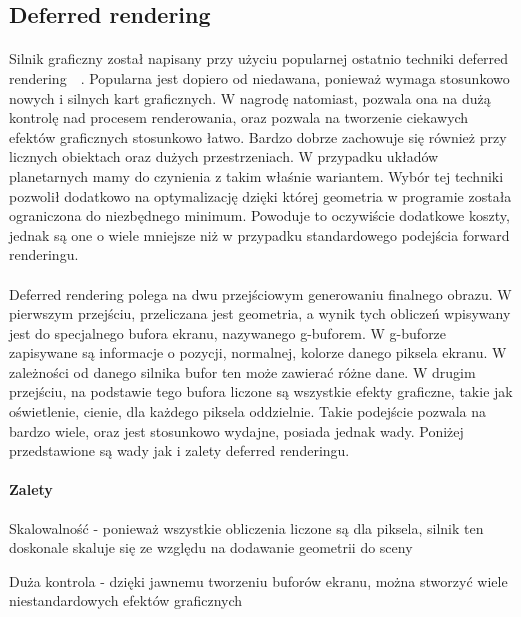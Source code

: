 \subsection{Deferred rendering}\label{sub:deferred rendering}
\paragraph{}

Silnik graficzny został napisany przy użyciu popularnej ostatnio techniki deferred rendering~\cite{gpugems:deferred}~\cite{calver:deferred}. Popularna jest dopiero od niedawana, ponieważ wymaga stosunkowo nowych i silnych kart graficznych. W nagrodę natomiast, pozwala ona na dużą kontrolę nad procesem renderowania, oraz pozwala na tworzenie ciekawych efektów graficznych stosunkowo łatwo. Bardzo dobrze zachowuje się również przy licznych obiektach oraz dużych przestrzeniach. W przypadku układów planetarnych mamy do czynienia z takim właśnie wariantem. Wybór tej techniki pozwolił dodatkowo na optymalizację dzięki której geometria w programie została ograniczona do niezbędnego minimum. Powoduje to oczywiście dodatkowe koszty, jednak są one o wiele mniejsze niż w przypadku standardowego podejścia forward renderingu.

\paragraph{}

Deferred rendering polega na dwu przejściowym generowaniu finalnego obrazu. W pierwszym przejściu, przeliczana jest geometria, a wynik tych obliczeń wpisywany jest do specjalnego bufora ekranu, nazywanego g-buforem. W g-buforze zapisywane są informacje o pozycji, normalnej, kolorze danego piksela ekranu. W zależności od danego silnika bufor ten może zawierać różne dane. W drugim przejściu, na podstawie tego bufora liczone są wszystkie efekty graficzne, takie jak oświetlenie, cienie, dla każdego piksela oddzielnie. Takie podejście pozwala na bardzo wiele, oraz jest stosunkowo wydajne, posiada jednak wady. Poniżej przedstawione są wady jak i zalety deferred renderingu.

\paragraph{Zalety}

\begin{description}
\item{Skalowalność} - ponieważ wszystkie obliczenia liczone są dla piksela, silnik ten doskonale skaluje się ze względu na dodawanie geometrii do sceny
\item{Duża kontrola} - dzięki jawnemu tworzeniu buforów ekranu, można stworzyć wiele niestandardowych efektów graficznych
\end{description}

